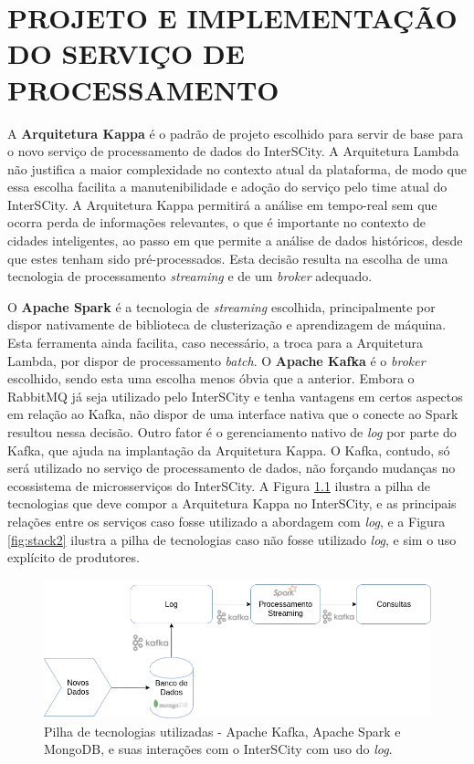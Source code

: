 \chapter[PROJETO E IMPLEMENTAÇÃO DO SERVIÇO DE PROCESSAMENTO]{PROJETO E IMPLEMENTAÇÃO DO SERVIÇO DE PROCESSAMENTO}

\label{chapter:architecture}

A \textbf{Arquitetura Kappa} é o padrão de projeto escolhido para servir de
base para o novo serviço de processamento de dados do InterSCity. A Arquitetura
Lambda não justifica a maior complexidade no contexto atual da plataforma, de
modo que essa escolha facilita a manutenibilidade e adoção do serviço pelo
time atual do InterSCity. A Arquitetura Kappa permitirá a análise em tempo-real
sem que ocorra perda de informações relevantes, o que é importante no contexto de
cidades inteligentes, ao passo em que permite a análise de dados históricos,
desde que estes tenham sido pré-processados. Esta decisão resulta na escolha de
uma tecnologia de processamento \textit{streaming} e de um
\textit{broker} adequado.

O \textbf{Apache Spark} é a tecnologia de \textit{streaming} escolhida,
principalmente por dispor nativamente de biblioteca de clusterização e
aprendizagem de máquina. Esta ferramenta ainda facilita, caso necessário, a
troca para a Arquitetura Lambda, por dispor de processamento \textit{batch}.
O \textbf{Apache Kafka} é o \textit{broker} escolhido, sendo esta uma escolha
menos óbvia que a anterior. Embora o RabbitMQ já seja utilizado pelo
InterSCity e tenha vantagens em certos aspectos em relação ao Kafka, não
dispor de uma interface nativa que o conecte ao Spark resultou nessa decisão.
Outro fator é o gerenciamento nativo de \textit{log} por parte do
Kafka, que ajuda na implantação da Arquitetura Kappa. O Kafka, contudo, só
será utilizado no serviço de processamento de dados, não forçando mudanças no
ecossistema de microsserviços do InterSCity. A Figura \ref{fig:stack} ilustra
a pilha de tecnologias que deve compor a Arquitetura Kappa no InterSCity, e
as principais relações entre os serviços caso fosse utilizado a abordagem com
\textit{log}, e a Figura \ref{fig:stack2} ilustra a pilha de tecnologias caso
não fosse utilizado \textit{log}, e sim o uso explícito de produtores.

\begin{figure}
  \centering
    \includegraphics[scale=0.5]{figuras/kappa_tools.png}
  \caption{Pilha de tecnologias utilizadas - Apache Kafka, Apache Spark e
    MongoDB, e suas interações com o InterSCity com uso do \textit{log}.}
  \label{fig:stack}
\end{figure}

